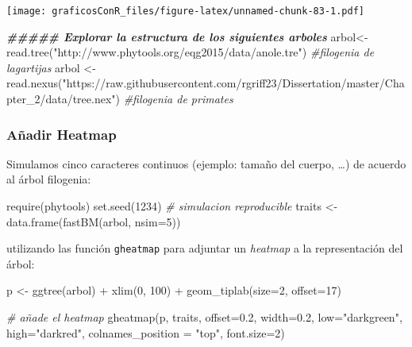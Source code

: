 \documentclass[
]{article}
\newenvironment{Shaded}{\begin{snugshade}}{\end{snugshade}}
\newcommand{\AttributeTok}[1]{\textcolor[rgb]{0.77,0.63,0.00}{#1}}
\newcommand{\CommentTok}[1]{\textcolor[rgb]{0.56,0.35,0.01}{\textit{#1}}}
\newcommand{\DecValTok}[1]{\textcolor[rgb]{0.00,0.00,0.81}{#1}}
\newcommand{\DocumentationTok}[1]{\textcolor[rgb]{0.56,0.35,0.01}{\textbf{\textit{#1}}}}
\newcommand{\FloatTok}[1]{\textcolor[rgb]{0.00,0.00,0.81}{#1}}
\newcommand{\FunctionTok}[1]{\textcolor[rgb]{0.00,0.00,0.00}{#1}}
\newcommand{\NormalTok}[1]{#1}
\newcommand{\OtherTok}[1]{\textcolor[rgb]{0.56,0.35,0.01}{#1}}
\newcommand{\SpecialCharTok}[1]{\textcolor[rgb]{0.00,0.00,0.00}{#1}}
\newcommand{\StringTok}[1]{\textcolor[rgb]{0.31,0.60,0.02}{#1}}
\numberwithin{ejcnt}{section}
\begin{document}
\texttt{[image: graficosConR\_files/figure-latex/unnamed-chunk-83-1.pdf]}

\begin{Shaded}
\begin{Highlighting}[]
\DocumentationTok{\#\#\#\#\# Explorar la estructura de los siguientes arboles}
\NormalTok{arbol}\OtherTok{\textless{}{-}}\FunctionTok{read.tree}\NormalTok{(}\StringTok{"http://www.phytools.org/eqg2015/data/anole.tre"}\NormalTok{) }\CommentTok{\#filogenia de lagartijas}
\NormalTok{arbol }\OtherTok{\textless{}{-}} \FunctionTok{read.nexus}\NormalTok{(}\StringTok{"https://raw.githubusercontent.com/rgriff23/Dissertation/master/Chapter\_2/data/tree.nex"}\NormalTok{) }\CommentTok{\#filogenia de primates}
\end{Highlighting}
\end{Shaded}

\hypertarget{auxf1adir-heatmap}{%
\subsubsection{Añadir Heatmap}\label{auxf1adir-heatmap}}

Simulamos cinco caracteres continuos (ejemplo: tamaño del cuerpo, \ldots) de acuerdo al árbol filogenia:

\begin{Shaded}
\begin{Highlighting}[]
\FunctionTok{require}\NormalTok{(phytools)}
\FunctionTok{set.seed}\NormalTok{(}\DecValTok{1234}\NormalTok{) }\CommentTok{\# simulacion reproducible}
\NormalTok{traits }\OtherTok{\textless{}{-}} \FunctionTok{data.frame}\NormalTok{(}\FunctionTok{fastBM}\NormalTok{(arbol, }\AttributeTok{nsim=}\DecValTok{5}\NormalTok{))}
\end{Highlighting}
\end{Shaded}

utilizando las función \texttt{gheatmap} para adjuntar un \emph{heatmap} a la representación del árbol:

\begin{Shaded}
\begin{Highlighting}[]
\NormalTok{p }\OtherTok{\textless{}{-}} \FunctionTok{ggtree}\NormalTok{(arbol) }\SpecialCharTok{+} \FunctionTok{xlim}\NormalTok{(}\DecValTok{0}\NormalTok{, }\DecValTok{100}\NormalTok{) }\SpecialCharTok{+} \FunctionTok{geom\_tiplab}\NormalTok{(}\AttributeTok{size=}\DecValTok{2}\NormalTok{, }\AttributeTok{offset=}\DecValTok{17}\NormalTok{) }

\CommentTok{\# añade el heatmap}
\FunctionTok{gheatmap}\NormalTok{(p, traits, }\AttributeTok{offset=}\FloatTok{0.2}\NormalTok{, }\AttributeTok{width=}\FloatTok{0.2}\NormalTok{, }\AttributeTok{low=}\StringTok{"darkgreen"}\NormalTok{, }\AttributeTok{high=}\StringTok{"darkred"}\NormalTok{, }\AttributeTok{colnames\_position =} \StringTok{"top"}\NormalTok{, }\AttributeTok{font.size=}\DecValTok{2}\NormalTok{)}
\end{Highlighting}
\end{Shaded}
\end{document}
